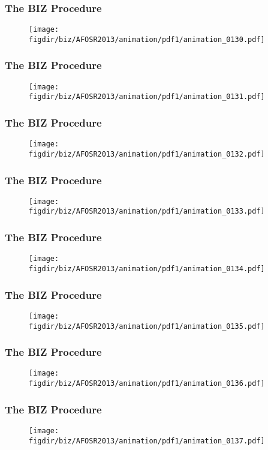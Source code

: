 \documentclass[13pt]{beamer}
\newcommand{\figdir}{../../fig}
\begin{document}
\begin{frame}\frametitle{The BIZ Procedure}\begin{figure}\texttt{[image: \\figdir/biz/AFOSR2013/animation/pdf1/animation\_0130.pdf]}\end{figure}\end{frame}
\begin{frame}\frametitle{The BIZ Procedure}\begin{figure}\texttt{[image: \\figdir/biz/AFOSR2013/animation/pdf1/animation\_0131.pdf]}\end{figure}\end{frame}
\begin{frame}\frametitle{The BIZ Procedure}\begin{figure}\texttt{[image: \\figdir/biz/AFOSR2013/animation/pdf1/animation\_0132.pdf]}\end{figure}\end{frame}
\begin{frame}\frametitle{The BIZ Procedure}\begin{figure}\texttt{[image: \\figdir/biz/AFOSR2013/animation/pdf1/animation\_0133.pdf]}\end{figure}\end{frame}
\begin{frame}\frametitle{The BIZ Procedure}\begin{figure}\texttt{[image: \\figdir/biz/AFOSR2013/animation/pdf1/animation\_0134.pdf]}\end{figure}\end{frame}
\begin{frame}\frametitle{The BIZ Procedure}\begin{figure}\texttt{[image: \\figdir/biz/AFOSR2013/animation/pdf1/animation\_0135.pdf]}\end{figure}\end{frame}
\begin{frame}\frametitle{The BIZ Procedure}\begin{figure}\texttt{[image: \\figdir/biz/AFOSR2013/animation/pdf1/animation\_0136.pdf]}\end{figure}\end{frame}
\begin{frame}\frametitle{The BIZ Procedure}\begin{figure}\texttt{[image: \\figdir/biz/AFOSR2013/animation/pdf1/animation\_0137.pdf]}\end{figure}\end{frame}
\end{document}
